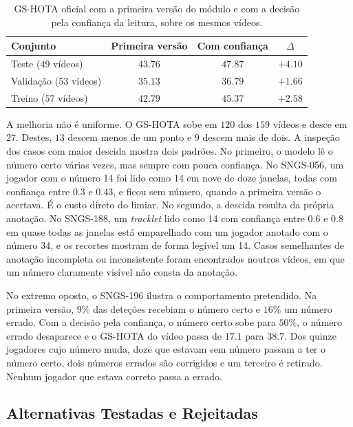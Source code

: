 \begin{table}[htbp]
    \centering
    \caption{GS-HOTA oficial com a primeira versão do módulo e com a decisão pela confiança da leitura, sobre os mesmos vídeos.}
    \label{tab:jnr-confianca-gshota}
    \begin{tabular}{|l|c|c|c|}
        \hline
        \textbf{Conjunto} & \textbf{Primeira versão} & \textbf{Com confiança} & \textbf{$\Delta$} \\
        \hline
        Teste ($49$ vídeos)     & $43.76$ & $47.87$ & $+4.10$ \\
        \hline
        Validação ($53$ vídeos) & $35.13$ & $36.79$ & $+1.66$ \\
        \hline
        Treino ($57$ vídeos)    & $42.79$ & $45.37$ & $+2.58$ \\
        \hline
    \end{tabular}
\end{table}

A melhoria não é uniforme. O GS-HOTA sobe em $120$ dos $159$ vídeos e desce em $27$. Destes, $13$ descem menos de um ponto e $9$ descem mais de dois. A inspeção dos casos com maior descida mostra dois padrões. No primeiro, o modelo lê o número certo várias vezes, mas sempre com pouca confiança. No SNGS-056, um jogador com o número 14 foi lido como 14 em nove de doze janelas, todas com confiança entre $0.3$ e $0.43$, e ficou sem número, quando a primeira versão o acertava. É o custo direto do limiar. No segundo, a descida resulta da própria anotação. No SNGS-188, um \emph{tracklet} lido como 14 com confiança entre $0.6$ e $0.8$ em quase todas as janelas está emparelhado com um jogador anotado com o número 34, e os recortes mostram de forma legível um 14. Casos semelhantes de anotação incompleta ou inconsistente foram encontrados noutros vídeos, em que um número claramente visível não consta da anotação.

No extremo oposto, o SNGS-196 ilustra o comportamento pretendido. Na primeira versão, $9\%$ das deteções recebiam o número certo e $16\%$ um número errado. Com a decisão pela confiança, o número certo sobe para $50\%$, o número errado desaparece e o GS-HOTA do vídeo passa de $17.1$ para $38.7$. Dos quinze jogadores cujo número muda, doze que estavam sem número passam a ter o número certo, dois números errados são corrigidos e um terceiro é retirado. Nenhum jogador que estava correto passa a errado.

\subsection{Alternativas Testadas e Rejeitadas}\label{sec:res_jnr_rejeitadas}

